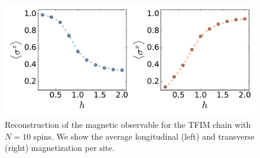 \documentclass[submission, Phys]{SciPost}
\begin{document}
\begin{figure}[t!]
\noindent \centering{}\includegraphics[width=\columnwidth]{plots/tfim_magnetizations}
\caption[The quantum many-body problem]{Reconstruction of the magnetic observable for the TFIM chain with $N=10$ spins. We show the average longitudinal (left) and transverse (right) magnetization per site.}
\label{tfim_magn} 
\end{figure}
\end{document}
